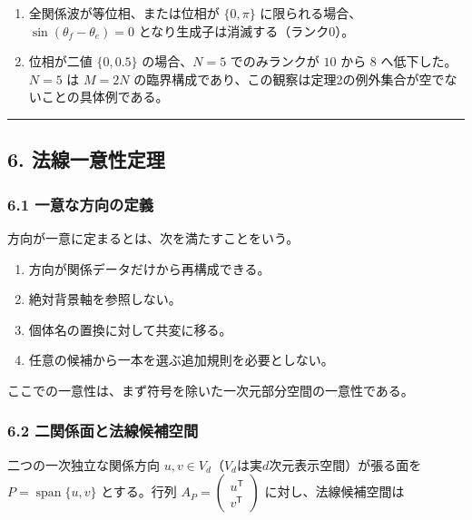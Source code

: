 \documentclass[
  a4paper,
]{ltjsarticle}
\providecommand{\tightlist}{%
  \setlength{\itemsep}{0pt}\setlength{\parskip}{0pt}}
\begin{document}
\begin{enumerate}
\def\labelenumi{\arabic{enumi}.}
\tightlist
\item
  全関係波が等位相、または位相が \(\{0,\pi\}\)
  に限られる場合、\(\sin(\theta_f-\theta_e)=0\)
  となり生成子は消滅する（ランク0）。
\item
  位相が二値 \(\{0,0.5\}\) の場合、\(N=5\) でのみランクが \(10\) から
  \(8\) へ低下した。\(N=5\) は \(M=2N\)
  の臨界構成であり、この観察は定理2の例外集合が空でないことの具体例である。
\end{enumerate}

\begin{center}\rule{0.5\linewidth}{0.5pt}\end{center}

\subsection{6.
法線一意性定理}\label{ux6cd5ux7ddaux4e00ux610fux6027ux5b9aux7406}

\subsubsection{6.1
一意な方向の定義}\label{ux4e00ux610fux306aux65b9ux5411ux306eux5b9aux7fa9}

方向が一意に定まるとは、次を満たすことをいう。

\begin{enumerate}
\def\labelenumi{\arabic{enumi}.}
\tightlist
\item
  方向が関係データだけから再構成できる。
\item
  絶対背景軸を参照しない。
\item
  個体名の置換に対して共変に移る。
\item
  任意の候補から一本を選ぶ追加規則を必要としない。
\end{enumerate}

ここでの一意性は、まず符号を除いた一次元部分空間の一意性である。

\subsubsection{6.2
二関係面と法線候補空間}\label{ux4e8cux95a2ux4fc2ux9762ux3068ux6cd5ux7ddaux5019ux88dcux7a7aux9593}

二つの一次独立な関係方向
\(u,v\in V_d\)（\(V_d\)は実\(d\)次元表示空間）が張る面を
\(P=\operatorname{span}\{u,v\}\) とする。行列
\(A_P=\begin{pmatrix}u^{\mathsf T}\\ v^{\mathsf T}\end{pmatrix}\)
に対し、法線候補空間は
\end{document}
